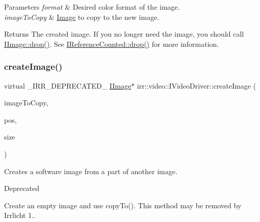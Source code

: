 \begin{DoxyParams}{Parameters}
{\em format} & Desired color format of the image. \\
\hline
{\em image\+To\+Copy} & \hyperlink{classImage}{Image} to copy to the new image. \\
\hline
\end{DoxyParams}
\begin{DoxyReturn}{Returns}
The created image. If you no longer need the image, you should call \hyperlink{classirr_1_1IReferenceCounted_a03856a09355b89d178090c4a5f738543}{I\+Image\+::drop()}. See \hyperlink{classirr_1_1IReferenceCounted_a03856a09355b89d178090c4a5f738543}{I\+Reference\+Counted\+::drop()} for more information. 
\end{DoxyReturn}
\mbox{\label{classirr_1_1video_1_1IVideoDriver_aa06059abf33e473d7af77e1fbc2b0f75}} 
\subsubsection{\texorpdfstring{create\+Image()}{createImage()}\hspace{0.1cm}{\footnotesize\ttfamily [3/4]}}
{\footnotesize\ttfamily virtual \+\_\+\+I\+R\+R\+\_\+\+D\+E\+P\+R\+E\+C\+A\+T\+E\+D\+\_\+ \hyperlink{classirr_1_1video_1_1IImage}{I\+Image}$\ast$ irr\+::video\+::\+I\+Video\+Driver\+::create\+Image (\begin{DoxyParamCaption}\item[{\hyperlink{classirr_1_1video_1_1IImage}{I\+Image} $\ast$}]{image\+To\+Copy,  }\item[{const core\+::position2d$<$ \hyperlink{namespaceirr_ac66849b7a6ed16e30ebede579f9b47c6}{s32} $>$ \&}]{pos,  }\item[{const \hyperlink{classirr_1_1core_1_1dimension2d}{core\+::dimension2d}$<$ \hyperlink{namespaceirr_a0416a53257075833e7002efd0a18e804}{u32} $>$ \&}]{size }\end{DoxyParamCaption})\hspace{0.3cm}{\ttfamily [pure virtual]}}



Creates a software image from a part of another image. 

\begin{DoxyRefDesc}{Deprecated}
\item[\hyperlink{deprecated__deprecated000024}{Deprecated}]Create an empty image and use copy\+To(). This method may be removed by Irrlicht 1.. \end{DoxyRefDesc}

